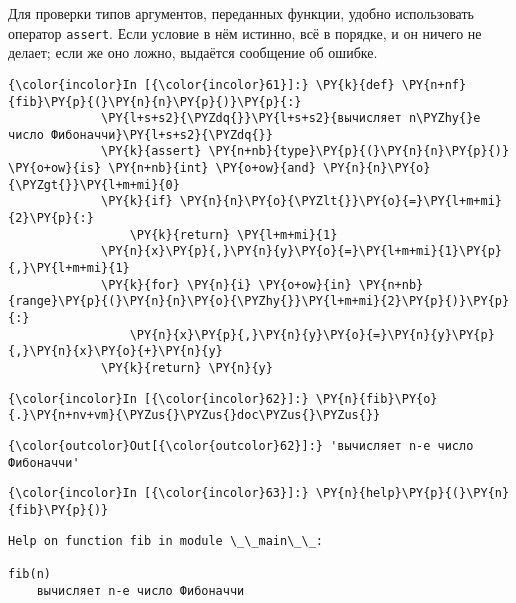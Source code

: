 Для проверки типов аргументов, переданных функции, удобно использовать
оператор \texttt{assert}. Если условие в нём истинно, всё в порядке, и
он ничего не делает; если же оно ложно, выдаётся сообщение об ошибке.

    \begin{Verbatim}[commandchars=\\\{\}]
{\color{incolor}In [{\color{incolor}61}]:} \PY{k}{def} \PY{n+nf}{fib}\PY{p}{(}\PY{n}{n}\PY{p}{)}\PY{p}{:}
             \PY{l+s+s2}{\PYZdq{}}\PY{l+s+s2}{вычисляет n\PYZhy{}е число Фибоначчи}\PY{l+s+s2}{\PYZdq{}}
             \PY{k}{assert} \PY{n+nb}{type}\PY{p}{(}\PY{n}{n}\PY{p}{)} \PY{o+ow}{is} \PY{n+nb}{int} \PY{o+ow}{and} \PY{n}{n}\PY{o}{\PYZgt{}}\PY{l+m+mi}{0}
             \PY{k}{if} \PY{n}{n}\PY{o}{\PYZlt{}}\PY{o}{=}\PY{l+m+mi}{2}\PY{p}{:}
                 \PY{k}{return} \PY{l+m+mi}{1}
             \PY{n}{x}\PY{p}{,}\PY{n}{y}\PY{o}{=}\PY{l+m+mi}{1}\PY{p}{,}\PY{l+m+mi}{1}
             \PY{k}{for} \PY{n}{i} \PY{o+ow}{in} \PY{n+nb}{range}\PY{p}{(}\PY{n}{n}\PY{o}{\PYZhy{}}\PY{l+m+mi}{2}\PY{p}{)}\PY{p}{:}
                 \PY{n}{x}\PY{p}{,}\PY{n}{y}\PY{o}{=}\PY{n}{y}\PY{p}{,}\PY{n}{x}\PY{o}{+}\PY{n}{y}
             \PY{k}{return} \PY{n}{y}
\end{Verbatim}

    \begin{Verbatim}[commandchars=\\\{\}]
{\color{incolor}In [{\color{incolor}62}]:} \PY{n}{fib}\PY{o}{.}\PY{n+nv+vm}{\PYZus{}\PYZus{}doc\PYZus{}\PYZus{}}
\end{Verbatim}

            \begin{Verbatim}[commandchars=\\\{\}]
{\color{outcolor}Out[{\color{outcolor}62}]:} 'вычисляет n-е число Фибоначчи'
\end{Verbatim}
        
    \begin{Verbatim}[commandchars=\\\{\}]
{\color{incolor}In [{\color{incolor}63}]:} \PY{n}{help}\PY{p}{(}\PY{n}{fib}\PY{p}{)}
\end{Verbatim}

    \begin{Verbatim}[commandchars=\\\{\}]
Help on function fib in module \_\_main\_\_:

fib(n)
    вычисляет n-е число Фибоначчи


    \end{Verbatim}


